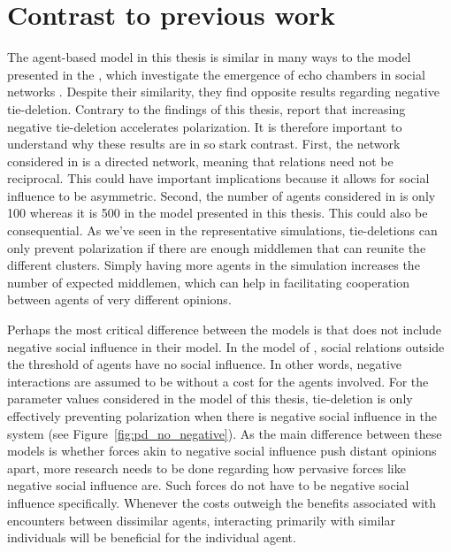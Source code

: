 \documentclass[11pt]{article}
\begin{document}
\section{Contrast to previous work}
The agent-based model in this thesis is similar in many ways to the model presented in the \textit{}, which investigate the emergence of echo chambers in social networks \cite{sasahara_social_2021}. Despite their similarity, they find opposite results regarding negative tie-deletion. Contrary to the findings of this thesis,  report that increasing negative tie-deletion accelerates polarization. It is therefore important to understand why these results are in so stark contrast. First, the network considered in  is a directed network, meaning that relations need not be reciprocal. This could have important implications because it allows for social influence to be asymmetric. Second, the number of agents considered in  is only 100 whereas it is 500 in the model presented in this thesis. This could also be consequential. As we've seen in the representative simulations, tie-deletions can only prevent polarization if there are enough middlemen that can reunite the different clusters. Simply having more agents in the simulation increases the number of expected middlemen, which can help in facilitating cooperation between agents of very different opinions. 

Perhaps the most critical difference between the models is that  does not include negative social influence in their model. In the model of , social relations outside the threshold of agents have no social influence. In other words, negative interactions are assumed to be without a cost for the agents involved. For the parameter values considered in the model of this thesis, tie-deletion is only effectively preventing polarization when there is negative social influence in the system (see Figure~\ref{fig:pd_no_negative}). 
As the main difference between these models is whether forces akin to negative social influence push distant opinions apart, more research needs to be done regarding how pervasive forces like negative social influence are. Such forces do not have to be negative social influence specifically. Whenever the costs outweigh the benefits associated with encounters between dissimilar agents, interacting primarily with similar individuals will be beneficial for the individual agent.
\end{document}
